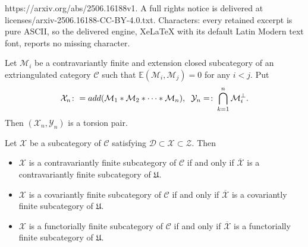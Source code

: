 \documentclass[10pt,a4paper]{amsart}
\def\C{\mathcal{C}}
\def\D{\mathcal{D}}
\def\E{\mathbb{E}}
\def\M{\mathcal{M}}
\def\X{\mathcal{X}}
\def\Y{\mathcal{Y}}
\def\Z{\mathcal {Z}}
\providecommand{\add}{\mathop{\rm add}\nolimits}%
\begin{document}
https://arxiv.org/abs/2506.16188v1. A full rights notice is delivered at licenses/arxiv-2506.16188-CC-BY-4.0.txt. Characters: every retained excerpt is pure ASCII, so the delivered engine, XeLaTeX with its default Latin Modern text font, reports no missing character.
\begin{lemma}\label{4}
Let $\M_i$ be a contravariantly finite and extension closed subcategory of an extriangulated category $\C$ such that
$\E(\M_i,\M_j)=0$ for any $i<j$. Put
$$\X_n\colon=\add(\M_1\ast\M_2\ast\cdots\ast\M_n),\;\;\Y_n=\colon\bigcap\limits_{k=1}^{n}\M_i^\perp.$$
Then $(\X_n,\Y_n)$ is a torsion pair.
\end{lemma}

\begin{lemma}\label{a}
Let $\X$ be a subcategory of $\C$ satisfying  $\D\subset\X\subset\Z$. Then
\begin{itemize}
  \item [\rm (1)] $\X$ is a contravariantly finite subcategory of $\C$ if and only if $\overline{\X}$ is a contravariantly finite subcategory of $\mathfrak{U}$.
  \item [\rm (2)] $\X$ is a covariantly finite subcategory of $\C$ if and only if $\overline{\X}$ is a covariantly finite subcategory of $\mathfrak{U}$.
  \item [\rm (3)] $\X$ is a functorially finite subcategory of $\C$ if and only if $\overline{\X}$ is a functorially finite subcategory of $\mathfrak{U}$.
\end{itemize}
\end{lemma}
\end{document}
